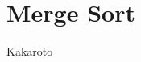 \documentclass[knowledge.tex]{subfiles}
\begin{document}
    \section{Merge Sort}
    Kakaroto
\end{document}
